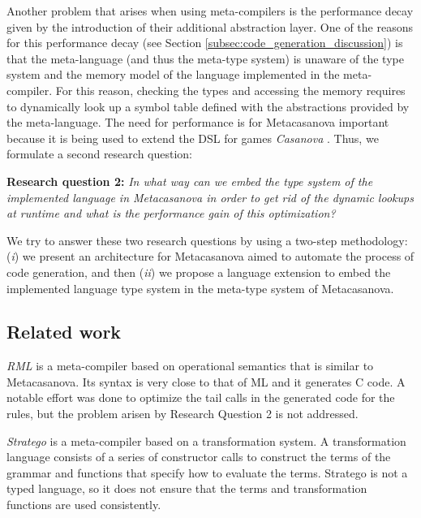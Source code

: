\vspace{0.2cm}
Another problem that arises when using meta-compilers is the performance decay given by the introduction of their additional abstraction layer. One of the reasons for this performance decay (see Section \ref{subsec:code_generation_discussion}) is that the meta-language (and thus the meta-type system) is unaware of the type system and the memory model of the language implemented in the meta-compiler. For this reason, checking the types and accessing the memory requires to dynamically look up a symbol table defined with the abstractions provided by the meta-language. The need for performance is for Metacasanova important because it is being used to extend the DSL for games \textit{Casanova} \cite{abbadi2015casanova, abbadithesis2017}. Thus, we formulate a second research question:

\vspace{0.2cm}
\noindent
\textbf{Research question 2:} \textit{In what way can we embed the type system of the implemented language in Metacasanova in order to get rid of the dynamic lookups at runtime and what is the performance gain of this optimization?}

\vspace{0.2cm}
We try to answer these two research questions by using a two-step methodology: (\textit{i}) we present an architecture for Metacasanova aimed to automate the process of code generation, and then (\textit{ii}) we propose a language extension to embed the implemented language type system in the meta-type system of Metacasanova.

\subsection{Related work}
\textit{RML} \cite{pettersson1996compiler} is a meta-compiler based on operational semantics that is similar to Metacasanova. Its syntax is very close to that of ML and it generates C code. A notable effort was done to optimize the tail calls in the generated code for the rules, but the problem arisen by Research Question 2 is not addressed.

\textit{Stratego} \cite{bravenboer2008stratego} is a meta-compiler based on a transformation system. A transformation language consists of a series of constructor calls to construct the terms of the grammar and functions that specify how to evaluate the terms. Stratego is not a typed language, so it does not ensure that the terms and transformation functions are used consistently.

